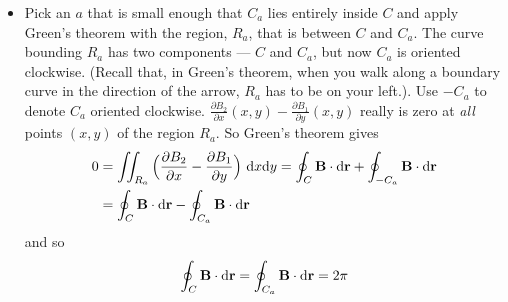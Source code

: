 \begin{eg}
\begin{itemize}
\item
Pick an $a$ that is small enough that $C_a$ lies entirely inside $C$ and
apply Green's theorem with the region, $R_a$, that is between $C$ and $C_a$.
The curve bounding $R_a$ has two components --- $C$ and $C_a$, but now $C_a$
is oriented clockwise. (Recall that, in Green's theorem, when you walk along a boundary curve in the direction of the arrow, $R_a$ has to be on your left.). Use 
$-C_a$ to denote $C_a$ oriented clockwise. 
$\frac{\partial B_2}{\partial x}(x,y) 
                - \frac{\partial B_1}{\partial y}(x,y)$ really is zero
at \emph{all} points $(x,y)$ of the region $R_a$. So Green's theorem gives
\begin{align*}
0&= \iint_{R_a}\Big(\frac{\partial B_2}{\partial x} 
                - \frac{\partial B_1}{\partial y}\Big)\ \mathrm{d}x\mathrm{d}y 
  = \oint_{C}\mathbf{B}\cdot\mathrm{d}\mathbf{r} + \oint_{-C_a}\mathbf{B}\cdot\mathrm{d}\mathbf{r} \\
 & = \oint_{C}\mathbf{B}\cdot\mathrm{d}\mathbf{r} - \oint_{C_a}\mathbf{B}\cdot\mathrm{d}\mathbf{r} 
\end{align*}
and so
\begin{align*}
\oint_{C}\mathbf{B}\cdot\mathrm{d}\mathbf{r}
= \oint_{C_a}\mathbf{B}\cdot\mathrm{d}\mathbf{r}
=2\pi
\end{align*}
\end{itemize}

\end{eg}
